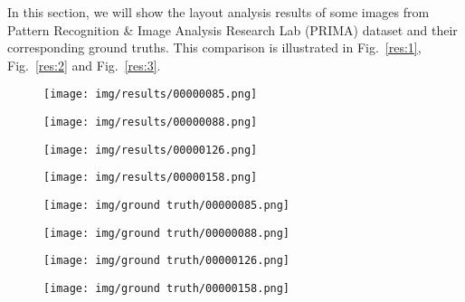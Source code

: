 \documentclass[conference]{IEEEtran}
\begin{document}
    In this section, we will show the layout analysis results of some images from
    Pattern Recognition \& Image Analysis Research Lab (PRIMA) dataset and their
    corresponding ground truths.
    This comparison is illustrated in Fig.~\ref{res:1}, Fig.~\ref{res:2} and Fig.~\ref{res:3}.

    \begin{figure*}[htbp]
        \centering

        \begin{subfigure}[b]{0.22\linewidth}
            \centering
            \texttt{[image: img/results/00000085.png]}
            \caption{}
            \label{res:1:85}
        \end{subfigure}
        \hfill
        \begin{subfigure}[b]{0.22\linewidth}
            \centering
            \texttt{[image: img/results/00000088.png]}
            \caption{}
            \label{res:1:88}
        \end{subfigure}
        \hfill
        \begin{subfigure}[b]{0.22\linewidth}
            \centering
            \texttt{[image: img/results/00000126.png]}
            \caption{}
            \label{res:1:126}
        \end{subfigure}
        \hfill
        \begin{subfigure}[b]{0.22\linewidth}
            \centering
            \texttt{[image: img/results/00000158.png]}
            \caption{}
            \label{res:1:158}
        \end{subfigure}

        \begin{subfigure}[b]{0.22\linewidth}
            \centering
            \texttt{[image: img/ground truth/00000085.png]}
            \caption{}
            \label{res:1:85:gt}
        \end{subfigure}
        \hfill
        \begin{subfigure}[b]{0.22\linewidth}
            \centering
            \texttt{[image: img/ground truth/00000088.png]}
            \caption{}
            \label{res:1:88:gt}
        \end{subfigure}
        \hfill
        \begin{subfigure}[b]{0.22\linewidth}
            \centering
            \texttt{[image: img/ground truth/00000126.png]}
            \caption{}
            \label{res:1:126:gt}
        \end{subfigure}
        \hfill
        \begin{subfigure}[b]{0.22\linewidth}
            \centering
            \texttt{[image: img/ground truth/00000158.png]}
            \caption{}
            \label{res:1:158:gt}
        \end{subfigure}


\end{figure*}
\end{document}
